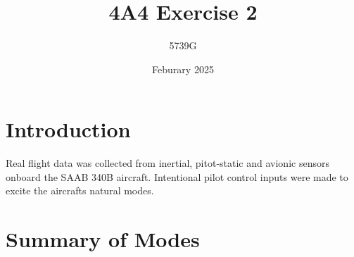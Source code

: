 \documentclass{article}
\begin{document}
\title{4A4 Exercise 2}
\author{5739G}
\date{Feburary 2025}
\maketitle

\section{Introduction}

Real flight data was collected from inertial, pitot-static and avionic sensors onboard the SAAB 340B aircraft.
Intentional pilot control inputs were made to excite the aircrafts natural modes.

\section{Summary of Modes}
\end{document}

